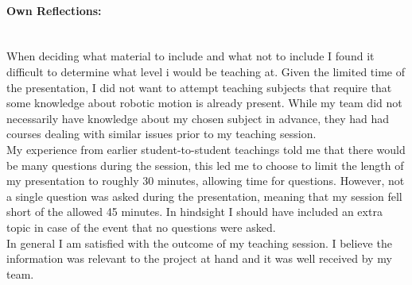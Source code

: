 \paragraph{Own Reflections:}~\\
When deciding what material to include and what not to include I found it difficult to determine what level i would be teaching at. Given the limited time of the presentation, I did not want to attempt teaching subjects that require that some knowledge about robotic motion is already present. While my team did not necessarily have knowledge about my chosen subject in advance, they had had courses dealing with similar issues prior to my teaching session.\\
My experience from earlier student-to-student teachings told me that there would be many questions during the session, this led me to choose to  limit the length of my presentation to roughly 30 minutes, allowing time for questions. However, not a single question was asked during the presentation, meaning that my session fell short of the allowed 45 minutes. In hindsight I should have included an extra topic in case of the event that no questions were asked.\\
In general I am satisfied with the outcome of my teaching session. I believe the information was relevant to the project at hand and it was well received by my team.
